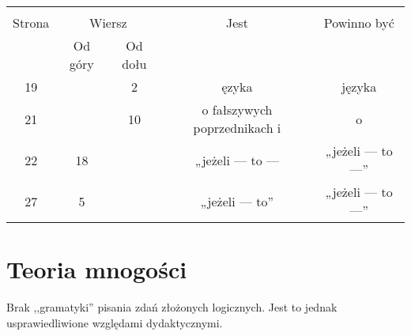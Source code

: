 \documentclass[a4paper,11pt]{article}
\begin{document}


\begin{center}

  \begin{tabular}{|c|c|c|c|c|}
    \hline
    & \multicolumn{2}{c|}{} & & \\
    Strona & \multicolumn{2}{c|}{Wiersz} & Jest
                              & Powinno być \\ \cline{2-3}
    & Od góry & Od dołu & & \\
    \hline
    19  & &  2 & ęzyka & języka \\
    21  & & 10 & o fałszywych poprzednikach i & o \\
    22  & 18 & & „jeżeli --- to --- & „jeżeli --- to ---” \\
    27  &  5 & & „jeżeli --- to” & „jeżeli --- to ---” \\
    \hline
  \end{tabular}

\end{center}

\vspace{\spaceTwo}










\newpage
\section{Teoria mnogości}

\vspace{\spaceTwo}





Brak ,,gramatyki'' pisania zdań złożonych logicznych. Jest to jednak usprawiedliwione względami dydaktycznymi.





\end{document}
